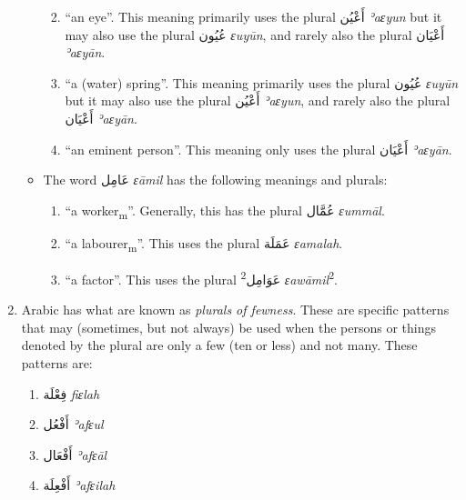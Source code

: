 \documentclass[
  10pt,
]{book}
\providecommand{\tightlist}{%
  \setlength{\itemsep}{0pt}\setlength{\parskip}{0pt}}
\begin{document}
\begin{enumerate}
\begin{itemize}
    \begin{enumerate}
    \def\labelenumii{\roman{enumii}.}
    \tightlist
    \item
      \enquote{an eye}. This meaning primarily uses the plural \foreignlanguage{arabic}{أَعْيُن} \emph{ʾaɛyun} but it may also use the plural \foreignlanguage{arabic}{عُيُون} \emph{ɛuyūn}, and rarely also the plural \foreignlanguage{arabic}{أَعْيَان} \emph{ʾaɛyān}.
    \item
      \enquote{a (water) spring}. This meaning primarily uses the plural \foreignlanguage{arabic}{عُيُون} \emph{ɛuyūn} but it may also use the plural \foreignlanguage{arabic}{أَعْيُن} \emph{ʾaɛyun}, and rarely also the plural \foreignlanguage{arabic}{أَعْيَان} \emph{ʾaɛyān}.
    \item
      \enquote{an eminent person}. This meaning only uses the plural \foreignlanguage{arabic}{أَعْيَان} \emph{ʾaɛyān}.
    \end{enumerate}
  \item
    The word \foreignlanguage{arabic}{عَامِل} \emph{ɛāmil} has the following meanings and plurals:

    \begin{enumerate}
    \def\labelenumii{\roman{enumii}.}
    \tightlist
    \item
      \enquote{a worker\textsubscript{m}}. Generally, this has the plural \foreignlanguage{arabic}{عُمَّال} \emph{ɛummāl}.
    \item
      \enquote{a labourer\textsubscript{m}}. This uses the plural \foreignlanguage{arabic}{عَمَلَة} \emph{ɛamalah}.
    \item
      \enquote{a factor}. This uses the plural \textsuperscript{2}\foreignlanguage{arabic}{عَوَامِل} \emph{ɛawāmil}\textsuperscript{2}.
    \end{enumerate}
  \end{itemize}
\item
  Arabic has what are known as \emph{plurals of fewness}. These are specific patterns that may (sometimes, but not always) be used when the persons or things denoted by the plural are only a few (ten or less) and not many. These patterns are:

  \begin{enumerate}
  \def\labelenumii{\roman{enumii}.}
  \tightlist
  \item
    \foreignlanguage{arabic}{فِعْلَة} \emph{fiɛlah}
  \item
    \foreignlanguage{arabic}{أَفْعُل} \emph{ʾafɛul}
  \item
    \foreignlanguage{arabic}{أَفْعَال} \emph{ʾafɛāl}
  \item
    \foreignlanguage{arabic}{أَفْعِلَة} \emph{ʾafɛilah}
  \end{enumerate}


\end{enumerate}
\end{document}

